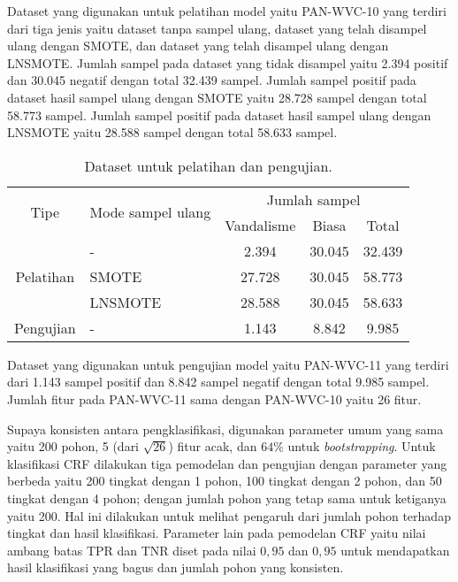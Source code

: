 Dataset yang digunakan untuk pelatihan model yaitu PAN-WVC-10 yang terdiri dari
tiga jenis yaitu dataset tanpa sampel ulang, dataset yang telah disampel ulang
dengan SMOTE, dan dataset yang telah disampel ulang dengan LNSMOTE.
Jumlah sampel pada dataset yang tidak disampel yaitu 2.394 positif dan 30.045
negatif dengan total 32.439 sampel.
Jumlah sampel positif pada dataset hasil sampel ulang dengan SMOTE yaitu 28.728
sampel dengan total 58.773 sampel.
Jumlah sampel positif pada dataset hasil sampel ulang dengan LNSMOTE yaitu
28.588 sampel dengan total 58.633 sampel.

\begin{table}[h!]
\centering
\begin{tabular}{|| c | l | c | c | c ||}
\hline
\multirow{2}{*}{Tipe} & \multirow{2}{*}{Mode sampel ulang} & \multicolumn{3}{c||}{Jumlah sampel} \\
\cline{3-5}
                         &                                       & Vandalisme & Biasa & Total \\
\hline
\hline
\multirow{3}{*}{Pelatihan} & -       &  2.394 & 30.045 & 32.439 \\
                              & SMOTE   & 27.728 & 30.045 & 58.773 \\
                              & LNSMOTE & 28.588 & 30.045 & 58.633 \\
\hline
Pengujian & - & 1.143 & 8.842 & 9.985 \\
\hline
\end{tabular}
\caption{Dataset untuk pelatihan dan pengujian.}
\label{table:dataset}
\end{table}

Dataset yang digunakan untuk pengujian model yaitu PAN-WVC-11 yang terdiri dari
1.143 sampel positif dan 8.842 sampel negatif dengan total 9.985 sampel.
Jumlah fitur pada PAN-WVC-11 sama dengan PAN-WVC-10 yaitu 26 fitur.

Supaya konsisten antara pengklasifikasi, digunakan parameter umum yang sama
yaitu 200 pohon, 5 (dari $\sqrt{26}$) fitur acak, dan $ 64\% $ untuk
\textit{bootstrapping}.
Untuk klasifikasi CRF dilakukan tiga pemodelan dan pengujian dengan parameter
yang berbeda yaitu 200 tingkat dengan 1 pohon, 100 tingkat dengan 2 pohon, dan
50 tingkat dengan 4 pohon; dengan jumlah pohon yang tetap sama untuk ketiganya
yaitu 200.
Hal ini dilakukan untuk melihat pengaruh dari jumlah pohon terhadap tingkat dan
hasil klasifikasi.
Parameter lain pada pemodelan CRF yaitu nilai ambang batas TPR dan TNR diset
pada nilai $0,95$ dan $0,95$ untuk mendapatkan hasil klasifikasi yang bagus dan
jumlah pohon yang konsisten.

